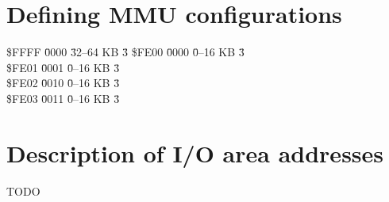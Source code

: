 \section{Defining MMU configurations}
\begin{tabbing}
\$FFFF \= 0000 \=32--64 KB \= 3 \kill %
\$FE00 \= 0000 \= 0--16 KB \= 3 \\
\$FE01 \= 0001 \= 0--16 KB \= 3 \\
\$FE02 \= 0010 \= 0--16 KB \= 3 \\
\$FE03 \= 0011 \= 0--16 KB \= 3 \\
\end{tabbing}

\section{Description of I/O area addresses}
TODO


